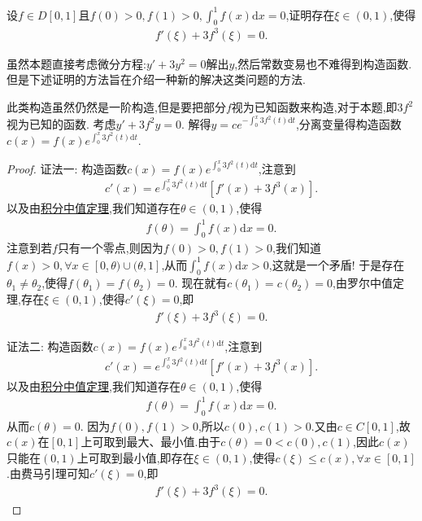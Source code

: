 \documentclass[../../main.tex]{subfiles}%
\begin{document}
\begin{example}
设\(f\in D[0,1]\)且\(f(0)>0,f(1)>0,\int_{0}^{1} f(x)\mathrm{d}x = 0\),证明存在\(\xi\in(0,1)\),使得
\begin{align*}
f'(\xi)+3f^{3}(\xi)=0.
\end{align*}
\end{example}
\begin{remark}
虽然本题直接考虑微分方程:$y'+3y^2=0$解出$y$,然后常数变易也不难得到构造函数.但是下述证明的方法旨在介绍一种新的解决这类问题的方法.
\end{remark}
\begin{note}
此类构造虽然仍然是一阶构造,但是要把部分\(f\)视为已知函数来构造,对于本题,即\(3f^{2}\)视为已知的函数. 考虑\(y'+3f^{2}y = 0\). 解得\(y = ce^{-\int_{0}^{x} 3f^{2}(t)\mathrm{d}t}\),分离变量得构造函数\(c(x)=f(x)e^{\int_{0}^{x} 3f^{2}(t)\mathrm{d}t}\).
\end{note}
\begin{proof}

{\color{blue}证法一:}
构造函数\(c(x)=f(x)e^{\int_{0}^{x} 3f^{2}(t)\mathrm{d}t}\),注意到
\begin{align*}
c'(x)=e^{\int_{0}^{x} 3f^{2}(t)\mathrm{d}t}[f'(x)+3f^{3}(x)].
\end{align*}
以及由\hyperref[theorem:积分中值定理]{积分中值定理},我们知道存在\(\theta\in(0,1)\),使得
\begin{align*}
f(\theta)=\int_{0}^{1} f(x)\mathrm{d}x = 0.
\end{align*}
注意到若\(f\)只有一个零点,则因为\(f(0)>0,f(1)>0\),我们知道\(f(x)>0,\forall x\in[0,\theta)\cup(\theta,1]\),从而\(\int_{0}^{1} f(x)\mathrm{d}x>0\),这就是一个矛盾!
于是存在\(\theta_1\neq\theta_2\),使得\(f(\theta_1)=f(\theta_2)=0\). 现在就有\(c(\theta_1)=c(\theta_2)=0\),由罗尔中值定理,存在\(\xi\in(0,1)\),使得\(c'(\xi)=0\),即
\begin{align*}
f'(\xi)+3f^{3}(\xi)=0.
\end{align*}

{\color{blue}证法二:}
构造函数\(c(x)=f(x)e^{\int_{0}^{x} 3f^{2}(t)\mathrm{d}t}\),注意到
\begin{align*}
c'(x)=e^{\int_{0}^{x} 3f^{2}(t)\mathrm{d}t}[f'(x)+3f^{3}(x)].
\end{align*}
以及由\hyperref[theorem:积分中值定理]{积分中值定理},我们知道存在\(\theta\in(0,1)\),使得
\begin{align*}
f(\theta)=\int_{0}^{1} f(x)\mathrm{d}x = 0.
\end{align*}
从而$c(\theta)=0$.
因为$f(0),f(1)>0$,所以$c(0),c(1)>0$.又由$c\in C[0,1]$,故$c(x)$在$[0,1]$上可取到最大、最小值.由于$c(\theta)=0<c(0),c(1)$,因此$c(x)$只能在$(0,1)$上可取到最小值,即存在\(\xi\in(0,1)\),使得$c(\xi)\leqslant  c(x),\forall x\in[0,1]$.由费马引理可知\(c'(\xi)=0\),即
\begin{align*}
f'(\xi)+3f^{3}(\xi)=0.
\end{align*}
\end{proof}
\end{document}
